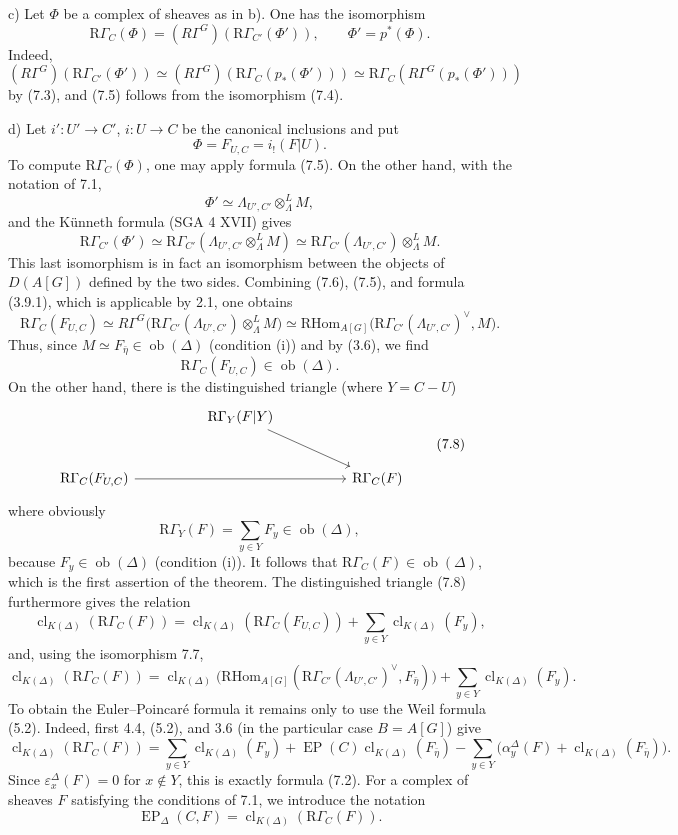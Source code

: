 \documentclass[11pt]{article}
\providecommand{\RHom}{\mathrm{RHom}}
\providecommand{\EP}{\operatorname{EP}}
\providecommand{\Ob}{\operatorname{ob}}
\providecommand{\RHom}{\mathrm{RHom}}
\providecommand{\RHom}{\mathrm R\mathcal{H}om}
\providecommand{\Ob}{\operatorname{ob}}
\providecommand{\EP}{\operatorname{EP}}
\providecommand{\Ob}{\operatorname{Ob}}
\providecommand{\clK}[1]{\operatorname{cl}_{K(#1)}}
\providecommand{\RG}{\mathrm R\Gamma}
\providecommand{\RHom}{\mathrm{RHom}}
\providecommand{\Ob}{\operatorname{ob}}
\begin{document}
c) Let $\Phi$ be a complex of sheaves as in b). One has the isomorphism
\[
\RG_C(\Phi)=(R\Gamma^G)(\RG_{C'}(\Phi')),
\qquad \Phi'=p^*(\Phi).
\tag{7.5}
\]
Indeed,
\[
(R\Gamma^G)(\RG_{C'}(\Phi'))
\simeq
(R\Gamma^G)(\RG_C(p_*(\Phi')))
\simeq
\RG_C(R\Gamma^G(p_*(\Phi')))
\]
by (7.3), and (7.5) follows from the isomorphism (7.4).

d) Let $i':U'\to C'$, $i:U\to C$ be the canonical inclusions and put
\[
\Phi=F_{U,C}=i_!(F|U).
\]
To compute $\RG_C(\Phi)$, one may apply formula (7.5). On the other hand, with the notation of 7.1,
\[
\Phi'\simeq \Lambda_{U',C'}\otimes_\Lambda^L M,
\]
and the Künneth formula (SGA 4 XVII) gives
\[
\RG_{C'}(\Phi')
\simeq
\RG_{C'}(\Lambda_{U',C'}\otimes_\Lambda^L M)
\simeq
\RG_{C'}(\Lambda_{U',C'})\otimes_\Lambda^L M.
\tag{7.6}
\]
This last isomorphism is in fact an isomorphism between the objects of $D(A[G])$ defined by the two sides. Combining (7.6), (7.5), and formula (3.9.1), which is applicable by 2.1, one obtains
\[
\RG_C(F_{U,C})
\simeq
R\Gamma^G\bigl(\RG_{C'}(\Lambda_{U',C'})\otimes_\Lambda^L M\bigr)
\simeq
\RHom_{A[G]}\bigl(\RG_{C'}(\Lambda_{U',C'})^\vee,M\bigr).
\tag{7.7}
\]
Thus, since $M\simeq F_{\bar\eta}\in\Ob(\Delta)$ (condition (i)) and by (3.6), we find
\[
\RG_C(F_{U,C})\in\Ob(\Delta).
\]
On the other hand, there is the distinguished triangle (where $Y=C-U$)
\[
\begin{tikzcd}[column sep=huge,row sep=large]
& \RG_Y(F|Y) \arrow[dr] & \\
\RG_C(F_{U,C}) \arrow[rr] && \RG_C(F)
\end{tikzcd}
\tag{7.8}
\]
where obviously
\[
\RG_Y(F)=\sum_{y\in Y}F_y\in\Ob(\Delta),
\]
because $F_y\in\Ob(\Delta)$ (condition (i)). It follows that $\RG_C(F)\in\Ob(\Delta)$, which is the first assertion of the theorem. The distinguished triangle (7.8) furthermore gives the relation
\[
\clK{\Delta}(\RG_C(F))
=
\clK{\Delta}(\RG_C(F_{U,C}))
+\sum_{y\in Y}\clK{\Delta}(F_y),
\]
and, using the isomorphism 7.7,
\[
\clK{\Delta}(\RG_C(F))
=
\clK{\Delta}\bigl(\RHom_{A[G]}(\RG_{C'}(\Lambda_{U',C'})^\vee,F_{\bar\eta})\bigr)
+\sum_{y\in Y}\clK{\Delta}(F_y).
\]
To obtain the Euler--Poincaré formula it remains only to use the Weil formula (5.2). Indeed, first 4.4, (5.2), and 3.6 (in the particular case $B=A[G]$) give
\[
\clK{\Delta}(\RG_C(F))
=
\sum_{y\in Y}\clK{\Delta}(F_y)
+\EP(C)\clK{\Delta}(F_{\bar\eta})
-\sum_{y\in Y}\bigl(\alpha_y^\Delta(F)+\clK{\Delta}(F_{\bar\eta})\bigr).
\]
Since $\varepsilon_x^\Delta(F)=0$ for $x\notin Y$, this is exactly formula (7.2). For a complex of sheaves $F$ satisfying the conditions of 7.1, we introduce the notation
\[
\EP_\Delta(C,F)=\clK{\Delta}(\RG_C(F)).
\]
\end{document}
